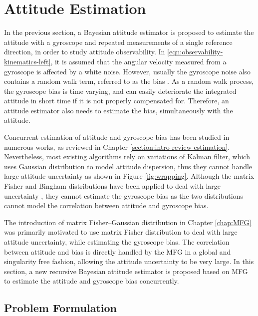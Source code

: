 \section{Attitude Estimation} \label{section:attEst}

In the previous section, a Bayesian attitude estimator is proposed to estimate the attitude with a gyroscope and repeated measurements of a single reference direction, in order to study attitude observability.
In \eqref{eqn:observability-kinematics-left}, it is assumed that the angular velocity measured from a gyroscope is affected by a white noise.
However, usually the gyroscope noise also contains a random walk term, referred to as the bias \cite{crassidis2007survey}.
As a random walk process, the gyroscope bias is time varying, and can easily deteriorate the integrated attitude in short time if it is not properly compensated for.
Therefore, an attitude estimator also needs to estimate the bias, simultaneously with the attitude.

Concurrent estimation of attitude and gyroscope bias has been studied in numerous works, as reviewed in Chapter \ref{section:intro-review-estimation}.
Nevertheless, most existing algorithms rely on variations of Kalman filter, which uses Gaussian distribution to model attitude dispersion, thus they cannot handle large attitude uncertainty as shown in Figure \ref{fig:wrapping}.
Although the matrix Fisher and Bingham distributions have been applied to deal with large uncertainty \cite{glover2014tracking,kurz2014recursive,lee2018bayesian}, they cannot estimate the gyroscope bias as the two distributions cannot model the correlation between attitude and gyroscope bias.

The introduction of matrix Fisher--Gaussian distribution in Chapter \ref{chap:MFG} was primarily motivated to use matrix Fisher distribution to deal with large attitude uncertainty, while estimating the gyroscope bias.
The correlation between attitude and bias is directly handled by the MFG in a global and singularity free fashion, allowing the attitude uncertainty to be very large.
In this section, a new recursive Bayesian attitude estimator is proposed based on MFG to estimate the attitude and gyroscope bias concurrently.

\subsection{Problem Formulation} \label{section:attEst-problem}

